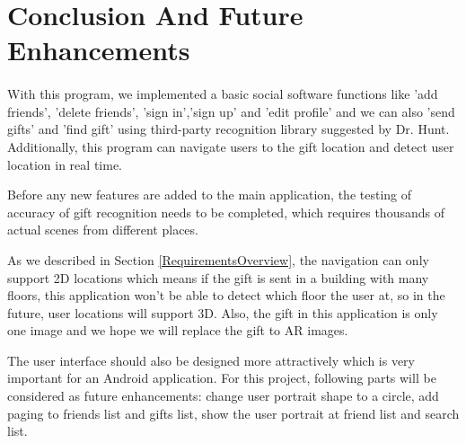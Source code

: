 \section{Conclusion And Future Enhancements}												
\label{sec:conclusion}
\paragraph{} With this program, we implemented a basic social software functions like 'add friends', 'delete friends', 'sign in','sign up' and 'edit profile' and we can also 'send gifts' and 'find gift' using third-party recognition library suggested by Dr. Hunt. Additionally, this program can navigate users to the gift location and detect user location in real time.
\par Before any new features are added to the main application, the testing of accuracy of gift recognition needs to be completed, which requires thousands of actual scenes from different places.
\par As we described in Section \ref{RequirementsOverview}, the navigation can only support 2D locations which means if the gift is sent in a building with many floors, this application won't be able to detect which floor the user at, so in the future, user locations will support 3D. Also, the gift in this application is only one image and we hope we will replace the gift to AR images.
\par The user interface should also be designed more attractively which is very important for an Android application. For this project, following parts will be considered as future enhancements: change user portrait shape to a circle, add paging to friends list and gifts list, show the user portrait at friend list and search list. 